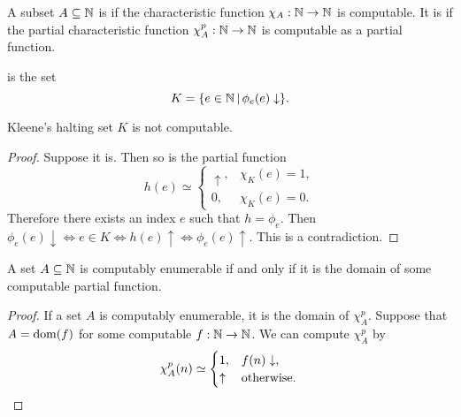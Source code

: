 
\begin{definition}
  A subset $A \subseteq \mathbb{N}$ is  if the characteristic function
  $\chi_A: \mathbb{N} \to \mathbb{N}$ is computable.
  It is  if the partial characteristic function
  $\chi_A^p: \mathbb{N} \to \mathbb{N}$ is computable as a partial function.
\end{definition}

\begin{definition}
   is the set
  \[
	K = \{e \in \mathbb{N} \,|\, \phi_e(e) \downarrow \}.
  \]
\end{definition}

\begin{proposition}
  Kleene's halting set $K$ is not computable.
\end{proposition}

\begin{proof}
  Suppose it is.
  Then so is the partial function
  \[
	h(e) \simeq
	\begin{cases}
	  \uparrow, & \chi_K(e) = 1, \\
	  0, & \chi_K(e) = 0.
	\end{cases}
  \]
  Therefore there exists an index $e$ such that $h = \phi_e$.
  Then $\phi_e(e) \downarrow \iff e \in K \iff h(e) \uparrow \iff \phi_e(e)
  \uparrow$.
  This is a contradiction.
\end{proof}


\begin{proposition}
  A set $A \subseteq \mathbb{N}$ is computably enumerable if and only if it is the
  domain of some computable partial function.
\end{proposition}

\begin{proof}
  If a set $A$ is computably enumerable, it is the domain of $\chi_A^p$.
  Suppose that $A = \operatorname{dom}(f)$ for some computable $f: \mathbb{N} \to \mathbb{N}$.
  We can compute $\chi_A^p$ by
  \[
	\chi_A^p(n) \simeq
	\begin{cases}
	  1, & f(n) \downarrow, \\
	  \uparrow & \text{otherwise.}
	\end{cases}
	\qedhere
  \]
\end{proof}


